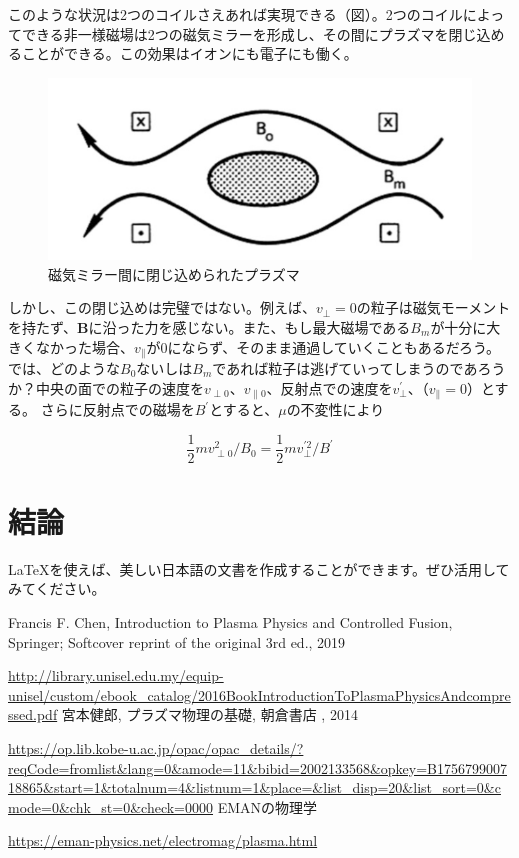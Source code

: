 \documentclass{ltjsarticle}
\numberwithin{equation}{section} %
\begin{document}
このような状況は2つのコイルさえあれば実現できる（図）。2つのコイルによってできる非一様磁場は2つの磁気ミラーを形成し、その間にプラズマを閉じ込めることができる。この効果はイオンにも電子にも働く。

\begin{figure}[htbp]
  \centering
  \includegraphics[width=0.7\linewidth]{trapped.png}
  \caption{磁気ミラー間に閉じ込められたプラズマ}
  \label{fig.trap}
\end{figure}

しかし、この閉じ込めは完璧ではない。例えば、$v_\perp=0$の粒子は磁気モーメントを持たず、$\bm{B}$に沿った力を感じない。また、もし最大磁場である$B_m$が十分に大きくなかった場合、$v_\parallel$が0にならず、そのまま通過していくこともあるだろう。
では、どのような$B_0$ないしは$B_m$であれば粒子は逃げていってしまうのであろうか？中央の面での粒子の速度を$v_{\perp 0}$、$v_{\parallel 0}$、反射点での速度を$v_\perp ^\prime$、（$v_\parallel =0$）とする。
さらに反射点での磁場を$B^\prime$とすると、$\mu$の不変性により

\begin{equation}
  \frac{1}{2}mv_{\perp 0} ^2 /B_0 = \frac{1}{2}mv_\perp ^{\prime 2}/B^\prime
\end{equation}






















\section{結論}
LaTeXを使えば、美しい日本語の文書を作成することができます。ぜひ活用してみてください。




\begin{thebibliography}{99}
 Francis F. Chen, Introduction to Plasma Physics and Controlled Fusion, Springer; Softcover reprint of the original 3rd ed., 2019\par
\url{http://library.unisel.edu.my/equip-unisel/custom/ebook_catalog/2016BookIntroductionToPlasmaPhysicsAndcompressed.pdf}
 宮本健郎, プラズマ物理の基礎, 朝倉書店 , 2014\par
\url{https://op.lib.kobe-u.ac.jp/opac/opac_details/?reqCode=fromlist&lang=0&amode=11&bibid=2002133568&opkey=B175679900718865&start=1&totalnum=4&listnum=1&place=&list_disp=20&list_sort=0&cmode=0&chk_st=0&check=0000}
 EMANの物理学\par
\url{https://eman-physics.net/electromag/plasma.html}
\end{thebibliography}
\end{document}
